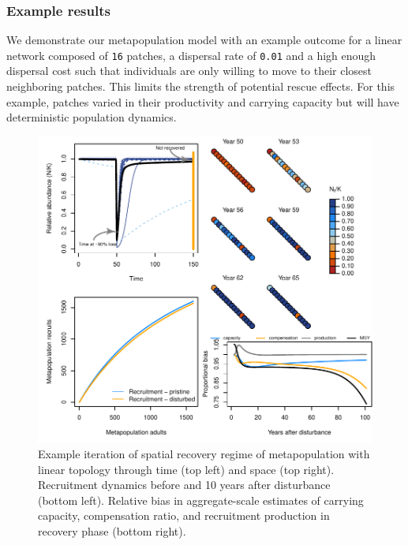 \documentclass[
]{article}
\begin{document}
\hypertarget{example-results}{%
\subsubsection{Example results}\label{example-results}}

We demonstrate our metapopulation model with an example outcome for a
linear network composed of \texttt{16} patches, a dispersal rate of
\texttt{0.01} and a high enough dispersal cost such that individuals are
only willing to move to their closest neighboring patches. This limits
the strength of potential rescue effects. For this example, patches
varied in their productivity and carrying capacity but will have
deterministic population dynamics.

\begin{figure}[H]

{\centering \includegraphics{Managing_for_ecological_surprises_in_metapopulations_files/figure-latex/example results1-1} 

}

\caption{Example iteration of spatial recovery regime of metapopulation with linear topology through time (top left) and space (top right). Recruitment dynamics before and 10 years after disturbance (bottom left). Relative bias in aggregate-scale estimates of carrying capacity, compensation ratio, and recruitment production in recovery phase (bottom right).}\label{fig:example results1}
\end{figure}
\newpage
\end{document}
